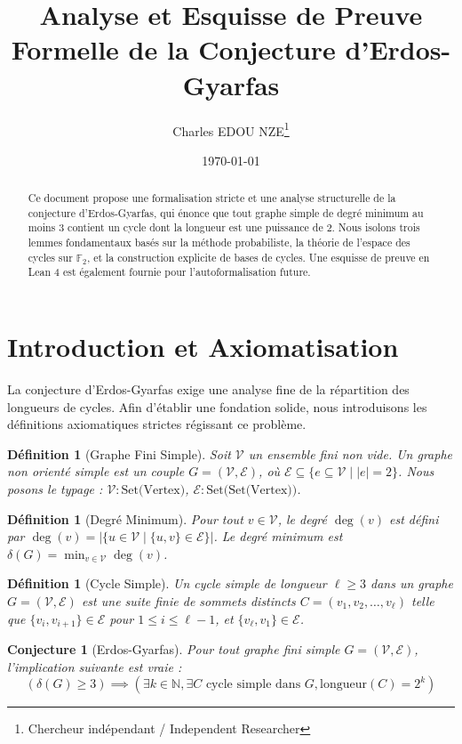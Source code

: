 \documentclass[11pt,a4paper]{article}
\title{Analyse et Esquisse de Preuve Formelle de la Conjecture d'Erdos-Gyarfas}
\author{Charles EDOU NZE\thanks{Chercheur indépendant / Independent Researcher}}
\date{\today}
\newtheorem{definition}[theorem]{Définition}
\newtheorem{conjecture}[theorem]{Conjecture}
\begin{document}
\maketitle

\begin{abstract}
Ce document propose une formalisation stricte et une analyse structurelle de la conjecture d'Erdos-Gyarfas, qui énonce que tout graphe simple de degré minimum au moins 3 contient un cycle dont la longueur est une puissance de 2. Nous isolons trois lemmes fondamentaux basés sur la méthode probabiliste, la théorie de l'espace des cycles sur $\mathbb{F}_2$, et la construction explicite de bases de cycles. Une esquisse de preuve en Lean 4 est également fournie pour l'autoformalisation future.
\end{abstract}

\section{Introduction et Axiomatisation}
La conjecture d'Erdos-Gyarfas exige une analyse fine de la répartition des longueurs de cycles. Afin d'établir une fondation solide, nous introduisons les définitions axiomatiques strictes régissant ce problème.

\begin{definition}[Graphe Fini Simple]
Soit $\mathcal{V}$ un ensemble fini non vide. Un graphe non orienté simple est un couple $G = (\mathcal{V}, \mathcal{E})$, où $\mathcal{E} \subseteq \{e \subseteq \mathcal{V} \mid |e| = 2\}$.
Nous posons le typage : $\mathcal{V} : \text{Set(Vertex)}$, $\mathcal{E} : \text{Set(Set(Vertex))}$.
\end{definition}

\begin{definition}[Degré Minimum]
Pour tout $v \in \mathcal{V}$, le degré $\deg(v)$ est défini par $\deg(v) = |\{u \in \mathcal{V} \mid \{u, v\} \in \mathcal{E}\}|$.
Le degré minimum est $\delta(G) = \min_{v \in \mathcal{V}} \deg(v)$.
\end{definition}

\begin{definition}[Cycle Simple]
Un cycle simple de longueur $\ell \ge 3$ dans un graphe $G = (\mathcal{V}, \mathcal{E})$ est une suite finie de sommets distincts $C = (v_1, v_2, \dots, v_\ell)$ telle que $\{v_i, v_{i+1}\} \in \mathcal{E}$ pour $1 \le i \le \ell-1$, et $\{v_\ell, v_1\} \in \mathcal{E}$.
\end{definition}

\begin{conjecture}[Erdos-Gyarfas]
Pour tout graphe fini simple $G = (\mathcal{V}, \mathcal{E})$, l'implication suivante est vraie :
\[ (\delta(G) \ge 3) \implies (\exists k \in \mathbb{N}, \exists C \text{ cycle simple dans } G, \text{longueur}(C) = 2^k) \]
\end{conjecture}
\end{document}
